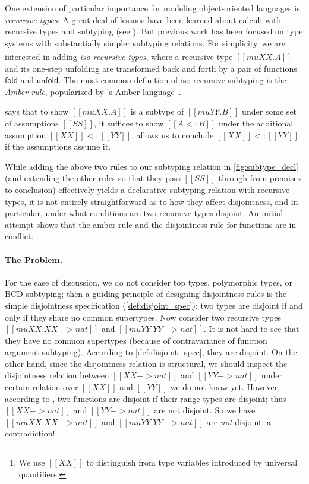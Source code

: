 One extension of particular importance for modeling object-oriented languages is
\textit{recursive types}. A great deal of lessons have been learned about
calculi with recursive types and subtyping (see \citet[chap.
20]{DBLP:books/daglib/0005958}). But previous work has been focused on type
systems with substantially simpler subtyping relations. For simplicity, we are
interested in adding \textit{iso-recursive types}, where a recursive type $[[mu XX . A]]$\footnote{We use $[[XX]]$ to distinguish from type variables introduced by universal quantifiers.} and its one-step unfolding are transformed back and forth by a pair
of functions $\mathsf{fold}$ and $\mathsf{unfold}$. The most common definition
of iso-recursive subtyping is the \textit{Amber rule}, popularized by
\citeauthor{DBLP:conf/litp/Cardelli85}'s Amber language~\citep{DBLP:conf/litp/Cardelli85}.
\begin{mathpar}
\end{mathpar}
 says that to show $[[mu XX . A]] $ is a subtype of $ [[mu YY . B]]$
under some set of assumptions $[[SS]]$, it suffices to show $[[A <: B]]$ under
the additional assumption $[[XX]] <: [[YY]]$.  allows us to
conclude $[[XX]] <: [[YY]]$ if the assumptions assume it.

While adding the above two rules to our subtyping relation in
\cref{fig:subtype_decl} (and extending the other rules so that they pass
$[[SS]]$ through from premises to conclusion) effectively yields a declarative
subtyping relation with recursive types, it is not entirely straightforward as
to how they affect disjointness, and in particular, under what conditions are
two recursive types disjoint. An initial attempt shows that the amber rule and
the disjointness rule for functions are in conflict.

\paragraph{The Problem.}

For the ease of discussion, we do not consider top types, polymorphic types, or
BCD subtyping; then a guiding principle of designing disjointness rules is the
simple disjointness specification (\cref{def:disjoint_spec}): two types are
disjoint if and only if they share no common supertypes. Now consider two
recursive types $[[ mu XX . XX -> nat ]]$ and $[[ mu YY . YY -> nat]]$. It is
not hard to see that they have no common supertypes (because of contravariance of function argument subtyping). According to
\cref{def:disjoint_spec}, they are disjoint. On the other hand, since the
disjointness relation is structural, we should inspect the disjointness relation
between $[[ XX -> nat ]]$ and $[[YY -> nat ]]$ under certain relation over
$[[XX]]$ and $[[YY]]$ we do not know yet. However, according to , two functions are
disjoint if their range types are disjoint; thus $[[ XX -> nat ]]$ and $[[YY ->
nat ]]$ are not disjoint. So we have $[[ mu XX . XX -> nat]]$ and $[[ mu YY . YY -> nat]]$
are \textit{not} disjoint: a contradiction!


